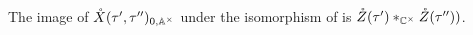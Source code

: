 \documentclass{article} %
\begin{document}
% 
% 
\begin{proposition}
    The image of $\mathring X(\tau',\tau'')_{0,\AA^\times}$ under the isomorphism of  is $\mathring Z(\tau')\ast_\Cx \mathring Z(\tau''))$. 
\end{proposition}
% 





\end{document}
